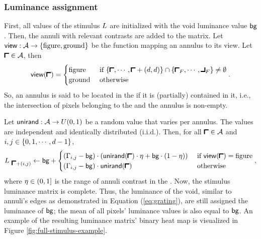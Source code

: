 \subsubsection{Luminance assignment}
\label{sec:luminance-assignment}

First, all values of the stimulus $L$ are initialized with the void luminance value $\mathsf{bg}$. Then, the annuli with relevant contrasts are added to the matrix. Let $\mathsf{view}: \mathcal{A} \to \{ \mathrm{figure}, \mathrm{ground} \}$ be the function mapping an annulus to its view. Let $\annstart \in \annuliset$, then
\begin{equation}
    \view(\annstart) = 
    \begin{cases}
        \fig & \text{ if } 
        \{ 
        \annstart, 
        \cdots,
        \annstart + (\diam, \diam)
        \}
        \cap
        \{ \figstart, \cdots, \figfinish \}
        \neq \emptyset \\
        \ground & \text{ otherwise} 
    \end{cases}.
\end{equation}
So, an annulus is said to be located in the \stimfig{} if it is (partially) contained in it, i.e., the intersection of pixels belonging to the \stimfig{} and the annulus is non-empty.

Let $\mathsf{unirand}: \mathcal{A} \to U(0, 1)$ be a random value that varies per annulus. The values are independent and identically distributed (i.i.d.). Then, for all $\annstart \in \annuliset$ and $i, j \in \{ 0, 1, \cdots, d - 1\}$,
\begin{equation}
    \fullmatrix_{\ \annstart + (i, j)} \leftarrow \vlum +
    \begin{cases}
        (\annmatrix_{i, j} - \vlum) \cdot \left( \unirand(\annstart) \cdot \contrange + \vlum \cdot (1 - \contrange) \right) 
        &\text{ if } \view(\annstart) = \fig  \\
         (\annmatrix_{i, j} - \vlum) \cdot \unirand(\annstart) 
        &\text{ otherwise}
    \end{cases},
\end{equation}
where $\eta \in (0, 1]$ is the range of annuli contrast in the \stimfig.
Now, the stimulus luminance matrix is complete.
Thus, the luminance of the void, similar to annuli's edges as demonstrated in Equation (\ref{eq:grating}), are still assigned the luminance of $\mathsf{bg}$; the mean of all pixels' luminance values is also equal to $\mathsf{bg}$. An example of the resulting luminance matrix' binary heat map is visualized in Figure \ref{fig:full-stimulus-example}.
